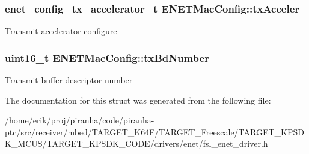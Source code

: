 \subsubsection[{\texorpdfstring{tx\+Acceler}{txAcceler}}]{\setlength{\rightskip}{0pt plus 5cm}enet\+\_\+config\+\_\+tx\+\_\+accelerator\+\_\+t E\+N\+E\+T\+Mac\+Config\+::tx\+Acceler}\hypertarget{structENETMacConfig_a463f21ee128ef777b328a6c50b186211}{}\label{structENETMacConfig_a463f21ee128ef777b328a6c50b186211}
Transmit accelerator configure 
\subsubsection[{\texorpdfstring{tx\+Bd\+Number}{txBdNumber}}]{\setlength{\rightskip}{0pt plus 5cm}uint16\+\_\+t E\+N\+E\+T\+Mac\+Config\+::tx\+Bd\+Number}\hypertarget{structENETMacConfig_a080cd5e2605b273bd4f1a9ac3b0d0e02}{}\label{structENETMacConfig_a080cd5e2605b273bd4f1a9ac3b0d0e02}
Transmit buffer descriptor number 

The documentation for this struct was generated from the following file\+:\begin{DoxyCompactItemize}
\item 
/home/erik/proj/piranha/code/piranha-\/ptc/src/receiver/mbed/\+T\+A\+R\+G\+E\+T\+\_\+\+K64\+F/\+T\+A\+R\+G\+E\+T\+\_\+\+Freescale/\+T\+A\+R\+G\+E\+T\+\_\+\+K\+P\+S\+D\+K\+\_\+\+M\+C\+U\+S/\+T\+A\+R\+G\+E\+T\+\_\+\+K\+P\+S\+D\+K\+\_\+\+C\+O\+D\+E/drivers/enet/fsl\+\_\+enet\+\_\+driver.\+h\end{DoxyCompactItemize}

